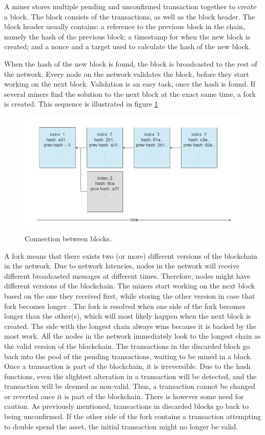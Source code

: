 A miner stores multiple pending and unconfirmed transaction together to create a block. The block consists of the transactions, as well as the block header. The block header usually contains: a reference to the previous block in the chain, namely the hash of the previous block; a timestamp for when the new block is created; and a nonce and a target used to calculate the hash of the new block. 

When the hash of the new block is found, the block is broadcasted to the rest of the network. Every node on the network validates the block, before they start working on the next block. Validation is an easy task, once the hash is found. If several miners find the solution to the next block at the exact same time, a fork is created. This sequence is illustrated in figure \ref{fig:blocks}
\begin{figure}[!htb]
\centering
	\includegraphics[width=1\textwidth]{Images/blocks}
	\caption{Connection between blocks.}
	\label{fig:blocks}
\end{figure}

A fork means that there exists  two (or more) different versions of the blockchain in the network. Due to network latencies, nodes in the network will receive different broadcasted messages at different times. Therefore, nodes might have different versions of the blockchain. The miners start working on the next block based on the one they received first, while storing the other version in case that fork becomes longer \cite{Nakamoto_bitcoin}. The fork is resolved when one side of the fork becomes longer than the other(s), which will most likely happen when the next block is created. The side with the longest chain always wins because it is backed by the most work. All the nodes in the network immediately look to the longest chain as the valid version of the blockchain. The transactions in the discarded block go back into the pool of the pending transactions, waiting to be mined in a block. Once a transaction is part of the blockchain, it is irreversible. Due to the hash functions, even the slightest alteration in a transaction will be detected, and the transaction will be deemed as non-valid. Thus, a transaction cannot be changed or reverted once it is part of the blockchain. There is however some need for caution. As previously mentioned, transactions in discarded blocks go back to being unconfirmed. If the other side of the fork contains a transaction attempting to double spend the asset, the initial transaction might no longer be valid. 

